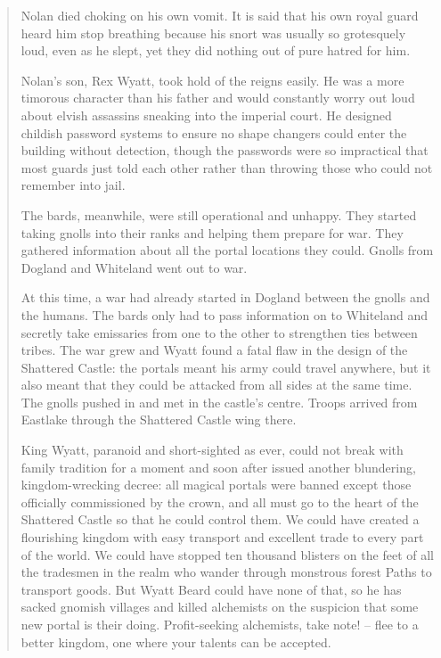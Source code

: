 \begin{quotation}
Nolan died choking on his own vomit.  It is said that his own royal guard heard him stop breathing because his snort was usually so grotesquely loud, even as he slept, yet they did nothing out of pure hatred for him.

	Nolan's son, Rex Wyatt, took hold of the reigns easily.  He was a more timorous character than his father and would constantly worry out loud about elvish assassins sneaking into the imperial court.  He designed childish password systems to ensure no shape changers could enter the building without detection, though the passwords were so impractical that most guards just told each other rather than throwing those who could not remember into jail.

	The bards, meanwhile, were still operational and unhappy.  They started taking gnolls into their ranks and helping them prepare for war.  They gathered information about all the portal locations they could.  Gnolls from Dogland and Whiteland went out to war.

	At this time, a war had already started in Dogland between the gnolls and the humans.  The bards only had to pass information on to Whiteland and secretly take emissaries from one to the other to strengthen ties between tribes.  The war grew and Wyatt found a fatal flaw in the design of the Shattered Castle: the portals meant his army could travel anywhere, but it also meant that they could be attacked from all sides at the same time.  The gnolls pushed in and met in the castle's centre.  Troops arrived from Eastlake through the Shattered Castle wing there.

	King Wyatt, paranoid and short-sighted as ever, could not break with family tradition for a moment and soon after issued another blundering, kingdom-wrecking decree: all magical portals were banned except those officially commissioned by the crown, and all must go to the heart of the Shattered Castle so that he could control them.  We could have created a flourishing kingdom with easy transport and excellent trade to every part of the world.  We could have stopped ten thousand blisters on the feet of all the tradesmen in the realm who wander through monstrous forest Paths to transport goods.  But Wyatt Beard could have none of that, so he has sacked gnomish villages and killed alchemists on the suspicion that some new portal is their doing.  Profit-seeking alchemists, take note! -- flee to a better kingdom, one where your talents can be accepted.

\end{quotation}

